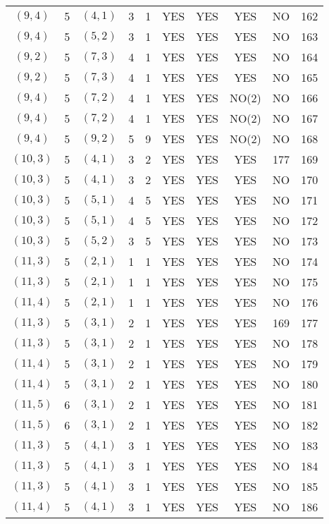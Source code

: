 \begin{longtable}{|c|c|c|c|c|c|c|c|c|c|}
$(9, 4)$ & 5 & $(4, 1)$ & 3 & 1 & YES & YES & YES & NO & 162\\
$(9, 4)$ & 5 & $(5, 2)$ & 3 & 1 & YES & YES & YES & NO & 163\\
$(9, 2)$ & 5 & $(7, 3)$ & 4 & 1 & YES & YES & YES & NO & 164\\
$(9, 2)$ & 5 & $(7, 3)$ & 4 & 1 & YES & YES & YES & NO & 165\\
$(9, 4)$ & 5 & $(7, 2)$ & 4 & 1 & YES & YES & NO(2) & NO & 166\\
$(9, 4)$ & 5 & $(7, 2)$ & 4 & 1 & YES & YES & NO(2) & NO & 167\\
$(9, 4)$ & 5 & $(9, 2)$ & 5 & 9 & YES & YES & NO(2) & NO & 168\\
$(10, 3)$ & 5 & $(4, 1)$ & 3 & 2 & YES & YES & YES & 177 & 169\\
$(10, 3)$ & 5 & $(4, 1)$ & 3 & 2 & YES & YES & YES & NO & 170\\
$(10, 3)$ & 5 & $(5, 1)$ & 4 & 5 & YES & YES & YES & NO & 171\\
$(10, 3)$ & 5 & $(5, 1)$ & 4 & 5 & YES & YES & YES & NO & 172\\
$(10, 3)$ & 5 & $(5, 2)$ & 3 & 5 & YES & YES & YES & NO & 173\\
$(11, 3)$ & 5 & $(2, 1)$ & 1 & 1 & YES & YES & YES & NO & 174\\
$(11, 3)$ & 5 & $(2, 1)$ & 1 & 1 & YES & YES & YES & NO & 175\\
$(11, 4)$ & 5 & $(2, 1)$ & 1 & 1 & YES & YES & YES & NO & 176\\
$(11, 3)$ & 5 & $(3, 1)$ & 2 & 1 & YES & YES & YES & 169 & 177\\
$(11, 3)$ & 5 & $(3, 1)$ & 2 & 1 & YES & YES & YES & NO & 178\\
$(11, 4)$ & 5 & $(3, 1)$ & 2 & 1 & YES & YES & YES & NO & 179\\
$(11, 4)$ & 5 & $(3, 1)$ & 2 & 1 & YES & YES & YES & NO & 180\\
$(11, 5)$ & 6 & $(3, 1)$ & 2 & 1 & YES & YES & YES & NO & 181\\
$(11, 5)$ & 6 & $(3, 1)$ & 2 & 1 & YES & YES & YES & NO & 182\\
$(11, 3)$ & 5 & $(4, 1)$ & 3 & 1 & YES & YES & YES & NO & 183\\
$(11, 3)$ & 5 & $(4, 1)$ & 3 & 1 & YES & YES & YES & NO & 184\\
$(11, 3)$ & 5 & $(4, 1)$ & 3 & 1 & YES & YES & YES & NO & 185\\
$(11, 4)$ & 5 & $(4, 1)$ & 3 & 1 & YES & YES & YES & NO & 186\\

\end{longtable}
